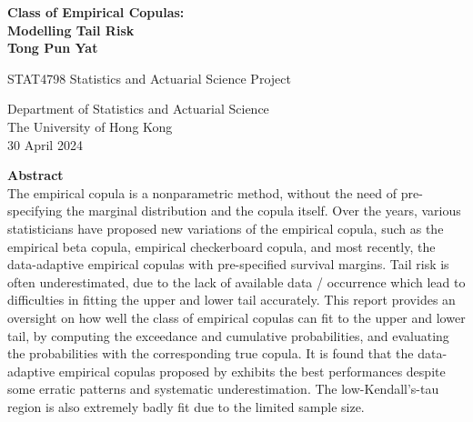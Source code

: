 \documentclass[12pt]{report}
\newcommand{\1}{\mathbf{1}}
\begin{document}
\begin{titlepage}
   \begin{center}
       \vspace*{1cm}
        \huge
       \textbf{Class of Empirical Copulas:} \\
       \huge
       \textbf{Modelling Tail Risk} \\
       \vspace{2cm}
        \LARGE
       \textbf{Tong Pun Yat}

       
        
       \vspace{7.0cm}
       \Large
       STAT4798 Statistics and Actuarial Science Project
            
       \vspace{0.8cm}
            
       Department of Statistics and Actuarial Science\\
       The University of Hong Kong\\
       30 April 2024
            
   \end{center}

\end{titlepage}

\newpage
\begin{flushleft}
\LARGE
\textbf{Abstract} \\
\normalsize
\vspace{1cm}
The empirical copula is a nonparametric method, without the need of pre-specifying the marginal distribution and the copula itself. Over the years, various statisticians have proposed new variations of the empirical copula, such as the empirical beta copula, empirical checkerboard copula, and most recently, the data-adaptive empirical copulas with pre-specified survival margins. Tail risk is often underestimated, due to the lack of available data / occurrence which lead to difficulties in fitting the upper and lower tail accurately. This report provides an oversight on how well the class of empirical copulas can fit to the upper and lower tail, by computing the exceedance and cumulative probabilities, and evaluating the probabilities with the corresponding true copula. It is found that the data-adaptive empirical copulas proposed by \cite{KojadinovicYi2024Smooth} exhibits the best performances despite some erratic patterns and systematic underestimation. The low-Kendall's-tau region is also extremely badly fit due to the limited sample size.
\end{flushleft}
\end{document}
